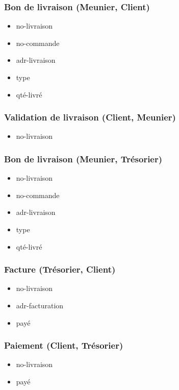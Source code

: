 \subsubsection*{Bon de livraison (Meunier, Client)}
\begin{itemize}
    \item no-livraison
    \item no-commande
    \item adr-livraison
    \item type
    \item qté-livré
\end{itemize}

\subsubsection*{Validation de livraison (Client, Meunier)}
\begin{itemize}
    \item no-livraison
\end{itemize}

\subsubsection*{Bon de livraison (Meunier, Trésorier)}
\begin{itemize}
    \item no-livraison
    \item no-commande
    \item adr-livraison
    \item type
    \item qté-livré
\end{itemize}

\subsubsection*{Facture (Trésorier, Client)}
\begin{itemize}
    \item no-livraison
    \item adr-facturation
    \item payé
\end{itemize}

\subsubsection*{Paiement (Client, Trésorier)}
\begin{itemize}
    \item no-livraison
    \item payé
\end{itemize}

